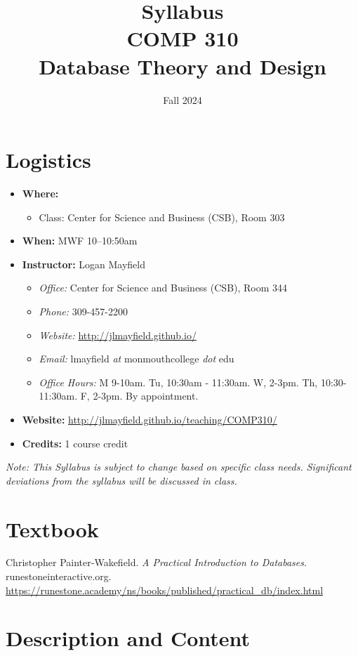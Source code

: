 \documentclass[10pt]{article}
\title{Syllabus \\ COMP 310 \\ Database Theory and Design}
\author{  }
\date{Fall 2024}
\begin{document}
\maketitle

\section{Logistics}
\begin{itemize}
\item \textbf{Where: }
\begin{itemize}
\item Class: Center for Science and Business (CSB), Room 303
\end{itemize}
\item \textbf{When: } MWF 10--10:50am
\item \textbf{Instructor: } Logan Mayfield
\begin{itemize}
\item \textit{Office: } Center for Science and Business (CSB), Room 344
\item \textit{Phone: } 309-457-2200 %
\item \textit{Website: } \url{http://jlmayfield.github.io/}
\item \textit{Email: } lmayfield \textit{at} monmouthcollege \textit{dot} edu
\item \textit{Office Hours: }  M 9-10am. Tu, 10:30am - 11:30am. W, 2-3pm. Th, 10:30-11:30am. F, 2-3pm. By appointment.
\end{itemize}
\item \textbf{Website: } \url{http://jlmayfield.github.io/teaching/COMP310/}
\item \textbf{Credits: } 1 course credit
\end{itemize}
\emph{Note: This Syllabus is subject to change based on specific class needs. Significant deviations from the syllabus will be discussed in class.}

\section{Textbook}

\noindent
Christopher Painter‑Wakefield. \textit{A Practical Introduction to Databases}.  runestoneinteractive.org. \url{https://runestone.academy/ns/books/published/practical_db/index.html} %

\section{Description and Content}
\end{document}
